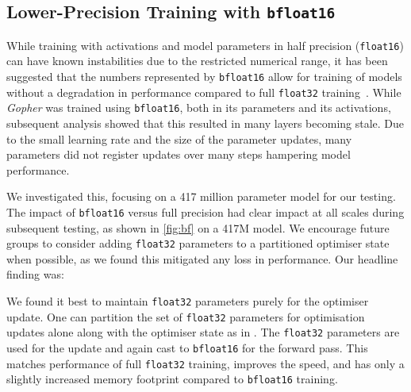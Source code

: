 \documentclass[11pt, a4paper, logo, internal, copyright, nonumbering]{deepmind}
\newenvironment{indentchunk}[1]{\begin{list}{}{\setlength{\leftmargin}{#1}}\item[]}
 {\end{list}}
\newcommand{\gopher}{\textit{Gopher}\xspace}
\begin{document}
\subsection{Lower-Precision Training with \texttt{bfloat16}}
While training with activations and model parameters in half precision (\texttt{float16}) can have known instabilities due to the restricted numerical range, it has been suggested that the numbers represented by \texttt{bfloat16} allow for training of models without a degradation in performance compared to full \texttt{float32} training~\citep{burgess2019bfloat16}. 
While \gopher was trained using \texttt{bfloat16}, both in its parameters and its activations, subsequent analysis showed that this resulted in many layers becoming stale.
Due to the small learning rate and the size of the parameter updates, many parameters did not register updates over many steps hampering model performance.

We investigated this, focusing on a 417 million parameter model for our testing.
The impact of \texttt{bfloat16} versus full precision had clear impact at all scales during subsequent testing, as shown in \autoref{fig:bf} on a 417M model.
We encourage future groups to consider adding \texttt{float32} parameters to a partitioned optimiser state when possible, as we found this mitigated any loss in performance.
Our headline finding was:

\begin{indentchunk}{1cm}
We found it best to maintain \texttt{float32} parameters purely for the optimiser update. One can partition the set of \texttt{float32} parameters for optimisation updates alone along with the optimiser state as in \citet{rajbhandari2020zero}.
The \texttt{float32} parameters are used for the update and again cast to \texttt{bfloat16} for the forward pass. This matches performance of full \texttt{float32} training, improves the speed, and has only a slightly increased memory footprint compared to \texttt{bfloat16} training.
\end{indentchunk}
\end{document}

